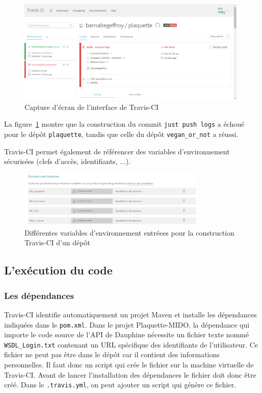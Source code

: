 \begin{figure}[!ht]
    \begin{center}
        \includegraphics[width=11cm]{assets/travis-ci.PNG}
    \end{center}
    \caption{Capture d'écran de l'interface de Travis-CI}
    \label{travis}
\end{figure}

La figure~\ref{travis} montre que la construction du commit \texttt{just push logs} a échoué pour le dépôt \texttt{plaquette}, tandis que celle du dépôt \texttt{vegan\_or\_not} a réussi.

Travis-CI permet également de référencer des variables d'environnement sécurisées (clefs d'accès, identifiants, ...).
\begin{figure}[!ht]
    \begin{center}
    \includegraphics[width=0.8\textwidth]{assets/env.PNG}
    \caption{Différentes variables d'environnement entréees pour la construction Travis-CI d'un dépôt}
    \label{env}
    \end{center}

\end{figure}

\subsection{L'exécution du code}
\subsubsection*{Les dépendances}



Travis-CI identifie automatiquement un projet Maven et installe les dépendances indiquées dans le \texttt{pom.xml}. Dans le projet Plaquette-MIDO, la dépendance qui importe le code source de l'API de Dauphine nécessite un fichier texte nommé \texttt{WSDL\_Login.txt} contenant un URL spécifique des identifiants de l'utilisateur. Ce fichier ne peut pas être dans le dépôt car il contient des informations personnelles. Il faut donc un script qui crée le fichier sur la machine virtuelle de Travis-CI. Avant de lancer l'installation des dépendances le fichier doit donc être créé. Dans le \texttt{.travis.yml}, on peut ajouter un script qui génère ce fichier. 

